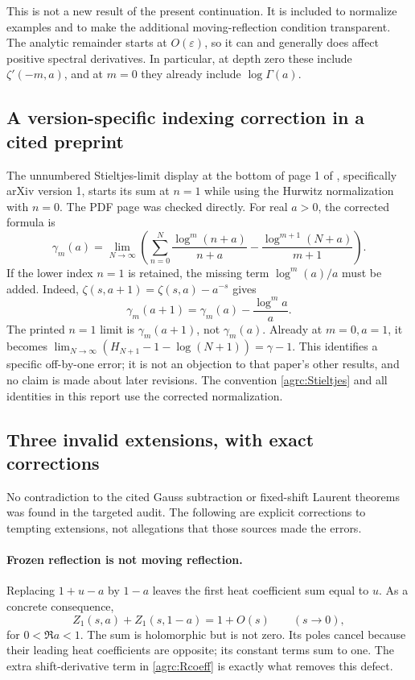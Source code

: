 This is not a new result of the present continuation. It is included
to normalize examples and to make the additional moving-reflection
condition transparent. The analytic remainder starts at
$O(\varepsilon)$, so it can and generally does affect positive spectral
 derivatives. In particular, at depth zero these include
$\zeta'(-m,a)$, and at $m=0$ they already include $\log\Gamma(a)$.

\subsection{A version-specific indexing correction in a cited preprint}

The unnumbered Stieltjes-limit display at the bottom of page 1 of
\cite{Can2024}, specifically arXiv version 1, starts its sum at $n=1$
while using the Hurwitz normalization with $n=0$. The PDF page was
checked directly. For real $a>0$, the corrected formula is
\begin{equation}\label{agrc:corrected-Stieltjes-limit}
 \gamma_m(a)=\lim_{N\to\infty}\left(
 \sum_{n=0}^{N}\frac{\log^m(n+a)}{n+a}
                  -\frac{\log^{m+1}(N+a)}{m+1}\right).
\end{equation}
If the lower index $n=1$ is retained, the missing term
$\log^m(a)/a$ must be added. Indeed,
$\zeta(s,a+1)=\zeta(s,a)-a^{-s}$ gives
\[
 \gamma_m(a+1)=\gamma_m(a)-\frac{\log^m a}{a}.
\]
The printed $n=1$ limit is $\gamma_m(a+1)$, not $\gamma_m(a)$.
Already at $m=0,a=1$, it becomes
$\lim_{N\to\infty}(H_{N+1}-1-\log(N+1))=\gamma-1$.
This identifies a specific off-by-one error; it is not an objection to
that paper's other results, and no claim is made about later revisions.
The convention \eqref{agrc:Stieltjes} and all identities in this report
use the corrected normalization.

\subsection{Three invalid extensions, with exact corrections}

No contradiction to the cited Gauss subtraction or fixed-shift Laurent
theorems was found in the targeted audit. The following are explicit
corrections to tempting extensions, not allegations that those sources
made the errors.

\paragraph{Frozen reflection is not moving reflection.}
Replacing $1+u-a$ by $1-a$ leaves the first heat coefficient sum equal
to $u$. As a concrete consequence,
\begin{equation}\label{agrc:frozen-counterexample}
 Z_1(s,a)+Z_1(s,1-a)=1+O(s)\qquad(s\to0),
\end{equation}
for $0<\Re a<1$. The sum is holomorphic but is not zero. Its poles
cancel because their leading heat coefficients are opposite; its
constant terms sum to one. The extra shift-derivative term in
\eqref{agrc:Rcoeff} is exactly what removes this defect.

